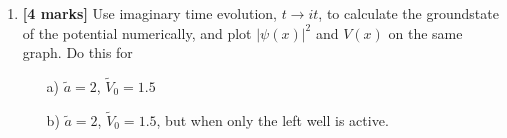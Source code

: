 \documentclass[11pt]{article}
\begin{document}
\begin{enumerate}
\item \textbf{[4 marks]}  Use imaginary time evolution, $t \rightarrow i t$, to calculate the groundstate of the potential numerically, and plot $|\psi(x)|^2$ and $V(x)$ on the same graph.  Do this for 
\begin{itemize}
\item[a)] $\tilde a = 2$, $\tilde V_0 = 1.5$
\item[b)] $\tilde a =2$, $\tilde V_0 =1.5$, but when only the left well is active.
\end{itemize}




\end{enumerate}
\end{document}
